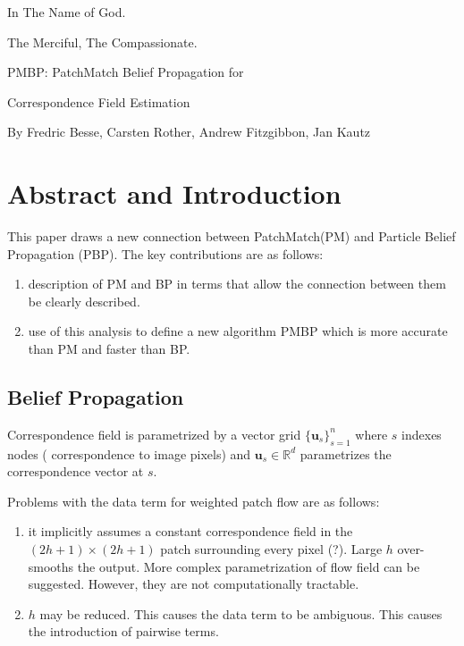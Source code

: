 \documentclass[a4paper,12pt]{article}
\begin{document}
\begin{center}
In The Name of God.

The Merciful, The Compassionate.
\vskip 1cm
{\Large\bfseries{PMBP: PatchMatch Belief Propagation for

Correspondence Field Estimation}}

\vskip 0.2cm
\tiny{By Fredric Besse, Carsten Rother, Andrew Fitzgibbon, Jan Kautz}
\end{center}

\section{Abstract and Introduction}
This paper draws a new connection between PatchMatch(PM) and Particle Belief Propagation (PBP).
The key contributions are as follows:
\begin{enumerate}
\item description of PM and BP in terms that allow the connection between them be clearly described.
\item use of this analysis to define a new algorithm PMBP which is more accurate than PM and faster than BP. 
\end{enumerate}

\subsection{Belief Propagation}
Correspondence field is parametrized by a vector grid $\{\mathbf{u}_s\}_{s=1}^{n}$ where $s$ indexes nodes ( correspondence to image pixels) and  $\mathbf{u}_s \in \mathbb{R}^d$ parametrizes the correspondence vector at $s$.

Problems with the data term for weighted patch flow are as follows:
\begin{enumerate}
\item it implicitly assumes a constant correspondence field in the $(2h+1)\times(2h+1)$ patch surrounding every pixel (?). Large $h$ over-smooths the output. More complex parametrization of flow field can be suggested. However, they are not computationally tractable.
\item $h$ may be reduced. This causes the data term to be ambiguous. This causes the introduction of pairwise terms.
\end{enumerate}
\end{document}
